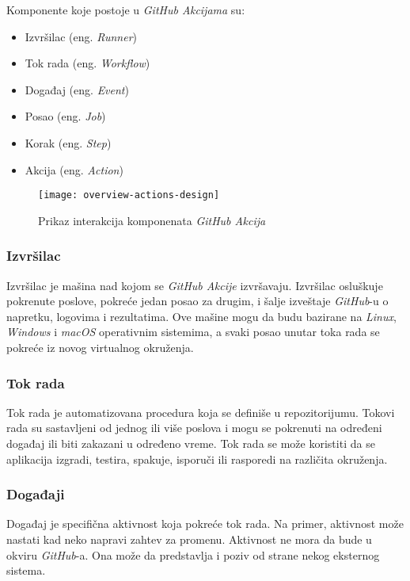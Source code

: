 Komponente koje postoje u \textit{GitHub Akcijama} su: 

\begin{itemize}
    \item Izvršilac (eng. \textit{Runner})
    \item Tok rada (eng. \textit{Workflow})
    \item Događaj (eng. \textit{Event})
    \item Posao (eng. \textit{Job})
    \item Korak (eng. \textit{Step})
    \item Akcija (eng. \textit{Action})
\end{itemize}

\begin{figure}[h]
    \centering
    \texttt{[image: overview-actions-design]}
    \caption{Prikaz interakcija komponenata \textit{GitHub Akcija}}
\end{figure}

\subsubsection{Izvršilac}
Izvršilac je mašina nad kojom se \textit{GitHub Akcije} izvršavaju. Izvršilac osluškuje pokrenute poslove,
pokreće jedan posao za drugim, i šalje izveštaje \textit{GitHub}-u o napretku, logovima i rezultatima. Ove 
mašine mogu da budu bazirane na \textit{Linux}, \textit{Windows} i \textit{macOS} operativnim sistemima, a svaki posao 
unutar toka rada se pokreće iz novog virtualnog okruženja.~\cite{GitHubActions}

\subsubsection{Tok rada}
Tok rada je automatizovana procedura koja se definiše u repozitorijumu. Tokovi rada su sastavljeni 
od jednog ili više poslova i mogu se pokrenuti na određeni događaj ili biti zakazani u određeno vreme. 
Tok rada se može koristiti da se aplikacija izgradi, testira, spakuje, isporuči ili rasporedi na 
različita okruženja.

\subsubsection{Događaji}
Događaj je specifična aktivnost koja pokreće tok rada. Na primer, aktivnost može nastati kad neko napravi 
zahtev za promenu. Aktivnost ne mora da bude u okviru \textit{GitHub}-a. Ona može da predstavlja i poziv od strane 
nekog eksternog sistema.

